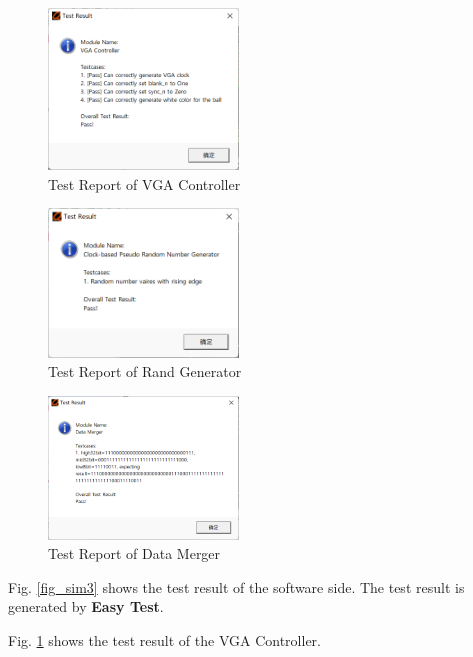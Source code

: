 \documentclass[conference]{IEEEtran}
\begin{document}
\begin{figure}[h] %
    \centering
    \includegraphics[width=0.45\textwidth]{imageset/testresult}
    \caption{Test Report of VGA Controller}
    \label{fig_sim4}
\end{figure}

\begin{figure}[h] %
    \centering
    \includegraphics[width=0.45\textwidth]{imageset/test3}
    \caption{Test Report of Rand Generator}
    \label{fig_sim5}
\end{figure}

\begin{figure}[t] %
    \centering
    \includegraphics[width=0.45\textwidth]{imageset/test4}
    \caption{Test Report of Data Merger}
    \label{fig_sim6}
\end{figure}



Fig. \ref{fig_sim3} shows the test result of the software side. The test result is generated by \textbf{Easy Test}.

Fig. \ref{fig_sim4} shows the test result of the VGA Controller.
\end{document}
